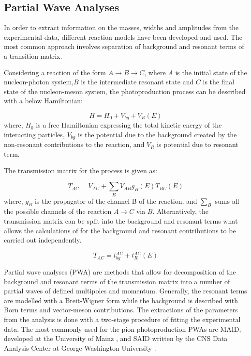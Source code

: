 \subsection{Partial Wave Analyses}

\indent In order to extract information on the masses, widths and amplitudes from the experimental data, different reaction models have been developed and used. The most common approach involves separation of background and resonant terms of a transition matrix.

\indent Considering a reaction of the form $A\rightarrow B\rightarrow C$, where $A$ is the initial state of the nucleon-photon system,$B$ is the intermediate resonant state and $C$ is the final state of the nucleon-meson system, the photoproduction process can be described with a below Hamiltonian:

\begin{equation}
H=H_{0}+V_{bg}+V_{R}(E)
\end{equation}
where, $H_{0}$ is a free Hamiltonian expressing the total kinetic energy of the interacting particles, $V_{bg}$ is the potential due to the background created by the non-resonant contributions to the reaction, and $V_{R}$ is potential due to resonant term.

\indent The transmission matrix for the process is given as:

\begin{equation}
T_{AC}=V_{AC}+\sum\limits_{B}V_{AB}g_{B}(E)T_{BC}(E)
\end{equation}
where, $g_{B}$ is the propagator of the channel B of the reaction, and $\sum\limits_{B}$ sums all the possible channels of the reaction $A\rightarrow C$ via $B$. Alternatively, the transmission matrix can be split into the background and resonant terms what allows the calculations of for the background and resonant contributions to be carried out independently.

\begin{equation}
T_{AC}=t_{bg}^{AC}+t_{R}^{AC}(E)
\end{equation}

\indent Partial wave analyses (PWA) are methods that allow for decomposition of the background and resonant terms of the transmission matrix into a number of partial waves of defined multipoles and momentum. Generally, the resonant terms are modelled with a Breit-Wigner form while the background is described with Born terms and vector-meson contributions. The extractions of the parameters from the analysis is done with a two-stage procedure of fitting the experimental data. The most commonly used for the pion photoproduction PWAs are MAID, developed at the University of Mainz \cite{maid}, and SAID written by the CNS Data Analysis Center at George Washington University \cite{said}.

